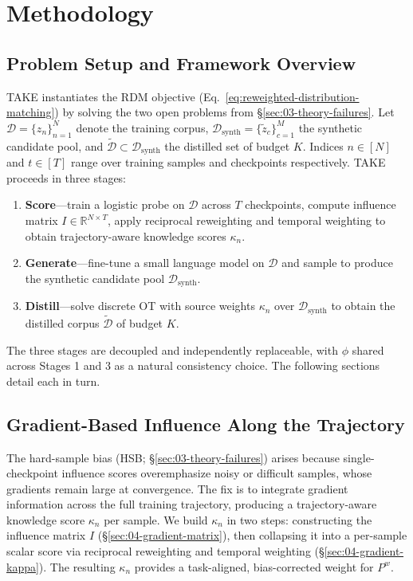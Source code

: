 \section{Methodology} \label{sec:04-method}
\subsection{Problem Setup and Framework Overview} \label{sec:04-method-setup}
\begin{foldable} %
  TAKE instantiates the RDM objective (Eq.~\ref{eq:reweighted-distribution-matching}) by solving the two open problems from \S\ref{sec:03-theory-failures}.
  Let $\mathcal{D} = \{z_n\}_{n=1}^{N}$ denote the training corpus, $\mathcal{D}_\text{synth} = \{\tilde{z}_c\}_{c=1}^{M}$ the synthetic candidate pool, and $\tilde{\mathcal{D}} \subset \mathcal{D}_\text{synth}$ the distilled set of budget $K$.
  Indices $n \in [N]$ and $t \in [T]$ range over training samples and checkpoints respectively.
  TAKE proceeds in three stages:
  \begin{enumerate}
    \item \textbf{Score}---train a logistic probe on $\mathcal{D}$ across $T$ checkpoints, compute influence matrix $I \in \mathbb{R}^{N \times T}$, apply reciprocal reweighting and temporal weighting to obtain trajectory-aware knowledge scores $\kappa_n$.
    \item \textbf{Generate}---fine-tune a small language model on $\mathcal{D}$ and sample to produce the synthetic candidate pool $\mathcal{D}_\text{synth}$.
    \item \textbf{Distill}---solve discrete OT with source weights $\kappa_n$ over $\mathcal{D}_\text{synth}$ to obtain the distilled corpus $\tilde{\mathcal{D}}$ of budget $K$.
  \end{enumerate}
  The three stages are decoupled and independently replaceable, with $\phi$ shared across Stages 1 and 3 as a natural consistency choice. The following sections detail each in turn.
\end{foldable}

\subsection{Gradient-Based Influence Along the Trajectory} \label{sec:04-method-gradient}
\begin{foldable} %
  The hard-sample bias (HSB; \S\ref{sec:03-theory-failures}) arises because single-checkpoint influence scores overemphasize noisy or difficult samples, whose gradients remain large at convergence.
  The fix is to integrate gradient information across the full training trajectory, producing a trajectory-aware knowledge score $\kappa_n$ per sample.
  We build $\kappa_n$ in two steps: constructing the influence matrix $I$ (\S\ref{sec:04-gradient-matrix}), then collapsing it into a per-sample scalar score via reciprocal reweighting and temporal weighting (\S\ref{sec:04-gradient-kappa}).
  The resulting $\kappa_n$ provides a task-aligned, bias-corrected weight for $P^w$.
\end{foldable}

